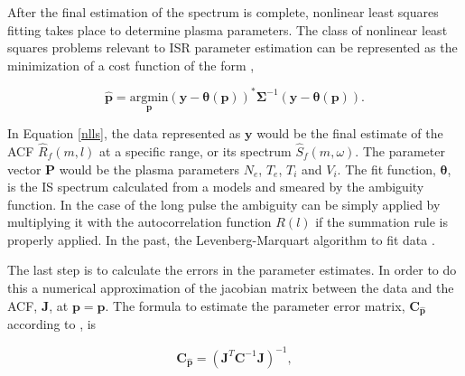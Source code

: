 \documentclass[draft,ras]{agutex}
\newcommand{\pcom}[2]{\marginpar{{\footnotesize \bf #1}}{\it {#2}}}
\begin{document}
\begin{article}
After the final estimation of the spectrum is complete, nonlinear least squares fitting takes place to determine plasma parameters.  
The class of nonlinear least squares problems relevant to ISR parameter estimation can be represented as the minimization of a cost function of the form \citep{kayvol1},

\begin{equation}
	\mathbf{\hat{p}}= \underset{\mathbf{p}}{\text{argmin}} (\mathbf{y}-\bm{\theta}(\mathbf{p}))^*\bm{\Sigma}^{-1}(\mathbf{y}-\bm{\theta}(\mathbf{p})).
\label{nlls}
\end{equation}

In Equation \ref{nlls}, the data represented as $\mathbf{y}$ would be the final estimate of the ACF $\widehat{R}_f(m,l)$ at a specific range, or its spectrum $\widehat{S}_f(m,\omega)$. The parameter vector $\mathbf{P}$ would be the plasma parameters $N_e$, $T_e$, $T_i$ and $V_i$. The fit function, $\bm{\theta}$, is the IS spectrum calculated from a models \citep[e.g.,][]{kudeki:milla:1} and smeared by the ambiguity function. In the case of the long pulse the ambiguity can be simply applied by multiplying it with the autocorrelation function $R(l)$ if the summation rule is properly applied. In the past, the Levenberg-Marquart algorithm to fit data \citep{nikoukar2008}.



The last step is to calculate the errors in the parameter estimates. In order to do this a numerical approximation of the jacobian matrix between the data and the ACF, $\mathbf{J}$, at $\mathbf{p}=\mathbf{\hat{p}}$. The formula to estimate the parameter error matrix, $\mathbf{C}_{\mathbf{\hat{p}}}$ according to \citet{Hysell:2000cq}, is


\begin{equation}
\label{eqn:jacinv}
\mathbf{C}_{\mathbf{\hat{p}}}=(\mathbf{J}^T \mathbf{C}^{-1}\mathbf{J})^{-1},
\end{equation}


\end{article}
\end{document}
